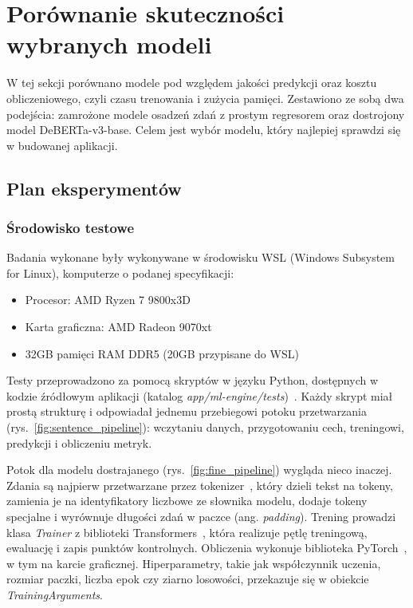 \section{Porównanie skuteczności wybranych modeli}
W tej sekcji porównano modele pod względem jakości predykcji oraz kosztu
obliczeniowego, czyli czasu trenowania i zużycia pamięci. Zestawiono ze sobą
dwa podejścia: zamrożone modele osadzeń zdań z prostym regresorem oraz
dostrojony model DeBERTa-v3-base. Celem jest wybór modelu, który najlepiej
sprawdzi się w budowanej aplikacji.


\subsection{Plan eksperymentów}
\subsubsection{Środowisko testowe}
Badania wykonane były wykonywane w środowisku WSL (Windows Subsystem for Linux), komputerze o
podanej specyfikacji:
\begin{itemize}
    \item Procesor: AMD Ryzen 7 9800x3D
    \item Karta graficzna: AMD Radeon 9070xt
    \item 32GB pamięci RAM DDR5 (20GB przypisane do WSL)
\end{itemize}

Testy przeprowadzono za pomocą skryptów w języku Python, dostępnych w kodzie
źródłowym aplikacji (katalog \textit{app/ml-engine/tests})~\cite{moja_praca}.
Każdy skrypt miał prostą strukturę i odpowiadał jednemu przebiegowi potoku
przetwarzania (rys.~\ref{fig:sentence_pipeline}): wczytaniu danych, przygotowaniu
cech, treningowi, predykcji i obliczeniu metryk.

Potok dla modelu dostrajanego (rys.~\ref{fig:fine_pipeline}) wygląda nieco inaczej.
Zdania są najpierw przetwarzane przez tokenizer~\cite{wolf2020transformers,hf_transformers_docs}, 
który dzieli tekst na tokeny, zamienia je na identyfikatory liczbowe ze słownika modelu,
dodaje tokeny specjalne i wyrównuje długości zdań w paczce (ang. \textit{padding}).
Trening prowadzi klasa \textit{Trainer} z biblioteki
Transformers~\cite{wolf2020transformers,hf_trainer_docs}, która realizuje pętlę treningową,
ewaluację i zapis punktów kontrolnych. Obliczenia wykonuje biblioteka
PyTorch~\cite{paszke2019pytorch,pytorch_docs}, w tym na karcie graficznej. Hiperparametry,
takie jak współczynnik uczenia, rozmiar paczki, liczba epok czy ziarno
losowości, przekazuje się w obiekcie \textit{TrainingArguments}.


